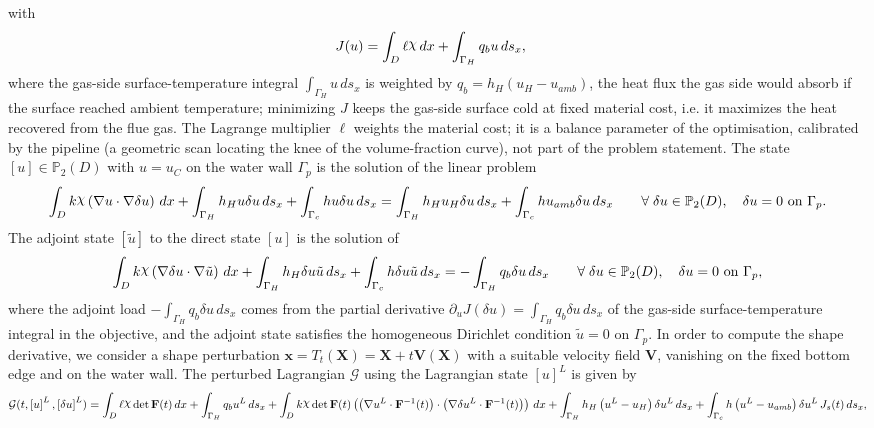 \documentclass[preview]{standalone}
\let\oldcdot\cdot
\let\cdot\oldcdot
\begin{document}
with
\begin{align*}
J(u) &=  \int_{D} \ell \raisebox{\depth}{$\chi$} \,dx + \int_{\Gamma_H} q_b u \,ds_x ,
 \end{align*}
where the gas-side surface-temperature integral $\int_{\Gamma_H} u \,ds_x$ is weighted by $q_b = h_H \left( u_H - u_{amb}\right)$, the heat flux the gas side would absorb if the surface reached ambient temperature; minimizing $J$ keeps the gas-side surface cold at fixed material cost, i.e. it maximizes the heat recovered from the flue gas.  The Lagrange multiplier $\ell$ weights the material cost; it is a balance parameter of the optimisation, calibrated by the pipeline (a geometric scan locating the knee of the volume-fraction curve), not part of the problem statement.
The state $\left[ u\right] \in \mathbb P_{2}(D)$ with $u = u_C$ on the water wall $\Gamma_p$ is the solution of the linear problem
\begin{dmath*}
\int_{D} k \raisebox{\depth}{$\chi$} \left(  \nabla u  \cdot  \nabla \delta u  \right) \,dx + \int_{\Gamma_H} h_H u \delta u \,ds_x + \int_{\Gamma_c} h u \delta u \,ds_x = \int_{\Gamma_H} h_H u_{H} \delta u \,ds_x + \int_{\Gamma_c} h u_{amb} \delta u \,ds_x \qquad \forall\; {\delta u\in \mathbb P_{2}(D)}, \quad \delta u = 0 \ \text{on } \Gamma_p .
\end{dmath*}
The adjoint state $\left[ \tilde u\right]$ to the direct state $\left[ u\right]$ is the solution of
\begin{dmath*}
\int_{D} k \raisebox{\depth}{$\chi$} \left(  \nabla \delta u  \cdot  \nabla \tilde u  \right) \,dx + \int_{\Gamma_H} h_H \delta u \tilde u \,ds_x + \int_{\Gamma_c} h \delta u \tilde u \,ds_x = - \int_{\Gamma_H} q_b \delta u \,ds_x \qquad \forall\; {\delta u\in \mathbb P_{2}(D)}, \quad \delta u = 0 \ \text{on } \Gamma_p ,
\end{dmath*}
where the adjoint load $- \int_{\Gamma_H} q_b \delta u \,ds_x$ comes from the partial derivative $\partial_{u} J(\delta u) = \int_{\Gamma_H} q_b \delta u \,ds_x$ of the gas-side surface-temperature integral in the objective, and the adjoint state satisfies the homogeneous Dirichlet condition $\tilde u = 0$ on $\Gamma_p$.
In order to compute the shape derivative, we consider a shape perturbation $\mathbf x = T_t(\mathbf X) = \mathbf X + t \mathbf  V(\mathbf X)$ with a suitable velocity field $\mathbf V$, vanishing on the fixed bottom edge and on the water wall.  The perturbed Lagrangian $\mathcal G$ using the Lagrangian state $\left[ u\right]^{L}$ is given by
\begin{dmath*}
\mathcal G(t,\left[ u\right]^{L},\left[ \delta u\right]^{L}) = \int_{D} \ell \raisebox{\depth}{$\chi$}  \operatorname{det}\mathbf F( t )  \,dx + \int_{\Gamma_H} q_b u^{L} \,ds_x +  \int_{D} k \raisebox{\depth}{$\chi$}  \operatorname{det}\mathbf F( t )  \left( \left(  \nabla u^{L} \cdot  \mathbf F^{-1}(t) \right) \cdot \left(  \nabla \delta u^{L} \cdot  \mathbf F^{-1}(t) \right) \right) \,dx + \int_{\Gamma_H} h_H \left( u^{L} - u_{H}\right) \delta u^{L} \,ds_x + \int_{\Gamma_c} h \left( u^{L} - u_{amb}\right) \delta u^{L} \,J_{s}(t) \,ds_x ,
\end{dmath*}
\end{document}
